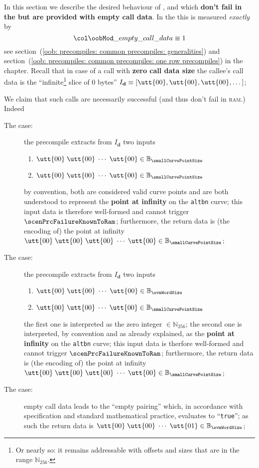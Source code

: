 In this section we describe the desired behaviour of ,  and  which \textbf{don't fail in the \hubMod{} but are provided with empty call data}.
In the \hubMod{} this is measured \emph{exactly} by
\[
	\locOobResultEmptyCallData \equiv 1
\]
see
section~(\ref{oob: precompiles: common precompiles: generalities}) and
section~(\ref{oob: precompiles: common precompiles: one row precompiles})
in the \oobMod{} chapter.
Recall that in case of a call with \textbf{zero call data size} the callee's call data is the ``infinite\footnote{Or nearly so: it remains addressable with offsets and sizes that are in the range $\mathbb{N}_{256}$.} slice of 0 bytes'' $I_\textbf{d} \equiv [\utt{00},
\utt{00},
\utt{00}, \dots]$;

We claim that such calls are necessarily successful (and thus don't fail in \textsc{ram}.)
Indeed
\begin{description}
	\item[The  case:] 
		the precompile extracts from $I_\textbf{d}$ two inputs
		\begin{enumerate}
		        \item $
				\utt{00} \;
				\utt{00} \; \cdots \;
				\utt{00} \in \mathbb{B}_{\smallCurvePointSize}$
		        \item $
				\utt{00} \;
				\utt{00} \; \cdots \;
				\utt{00} \in \mathbb{B}_{\smallCurvePointSize}$
		\end{enumerate}
		by \evm{} convention, both are considered valid curve points and are both understood to represent the \textbf{point at infinity} on the \texttt{altbn} curve;
		this input data is therefore well-formed and cannot trigger $\scenPrcFailureKnownToRam$; 
		furthermore, the return data is (the \evm{} encoding of) the point at infinity
		$
		\utt{00} \;
		\utt{00} \;
		\utt{00} \; \cdots \;
		\utt{00} \in \mathbb{B}_{\smallCurvePointSize}$;
	\item[The  case:] 
		the precompile extracts from $I_\textbf{d}$ two inputs
		\begin{enumerate}
		        \item $
				\utt{00} \;
				\utt{00} \; \cdots \;
				\utt{00} \in \mathbb{B}_{\evmWordSize}$
		        \item $
				\utt{00} \;
				\utt{00} \; \cdots \;
				\utt{00} \in \mathbb{B}_{\smallCurvePointSize}$
		\end{enumerate}
		the first one is interpreted as the zero integer $\in \mathbb{N}_{256}$;
		the second one is interpreted, by \evm{} convention and as already explained, as the \textbf{point at infinity} on the \texttt{altbn} curve;
		this input data is therfore well-formed and cannot trigger $\scenPrcFailureKnownToRam$; 
		furthermore, the return data is (the \evm{} encoding of) the point at infinity
		$
		\utt{00} \;
		\utt{00} \;
		\utt{00} \; \cdots \;
		\utt{00} \in \mathbb{B}_{\smallCurvePointSize}$;
	\item[The  case:]
		empty call data leads to the ``empty pairing'' which, in accordance with \evm{} specification and standard mathematical practice, evaluates to ``\texttt{true}'';
		as such the return data is
		$
		\utt{00} \;
		\utt{00} \; \cdots \;
		\utt{01} \in \mathbb{B}_{\evmWordSize}$;
\end{description}
